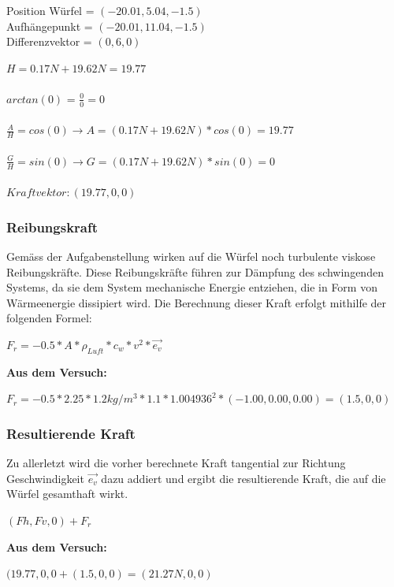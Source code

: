 \documentclass[../main.tex]{subfiles}
\begin{document}
Position Würfel = $(-20.01,5.04,-1.5)$\\
Aufhängepunkt = $(-20.01,11.04,-1.5)$\\
Differenzvektor = $(0,6,0)$\\
\begin{mdframed}
$H = 0.17N +19.62N = 19.77$\\\\
$arctan(0)$ = $\frac{0}{0} = 0$\\\\
$\frac{A}{H}= cos(0) \rightarrow A = (0.17N +19.62N) * cos(0)= 19.77$\\\\
$\frac{G}{H}= sin(0) \rightarrow G = (0.17N +19.62N) * sin(0)= 0$\\\\
$Kraftvektor: (19.77,0,0)$
\end{mdframed}
\subsubsection{Reibungskraft}
Gemäss der Aufgabenstellung wirken auf die Würfel noch turbulente viskose Reibungskräfte. Diese Reibungskräfte führen zur Dämpfung des schwingenden Systems, da sie dem System mechanische Energie entziehen, die in Form von Wärmeenergie dissipiert wird. Die Berechnung dieser Kraft erfolgt mithilfe der folgenden Formel:\begin{mdframed}
$F_r = -0.5 * A*\rho_{Luft}*c_w*v^2*\vec{e_v}$
\end{mdframed}
\textbf {Aus dem Versuch:}
\begin{mdframed}
$F_r = -0.5 * 2.25*1.2kg/m^3*1.1*1.004936^2*(-1.00, 0.00, 0.00) = (1.5,0,0)$
\end{mdframed}
\subsubsection{Resultierende Kraft}
Zu allerletzt wird die vorher berechnete Kraft tangential zur Richtung Geschwindigkeit $\vec{e_v}$ dazu addiert und ergibt die resultierende Kraft, die auf die Würfel gesamthaft wirkt.
\begin{mdframed}
$(Fh,Fv,0) + F_r$
\end{mdframed}
\textbf {Aus dem Versuch:}
\begin{mdframed}
$(19.77,0,0 + (1.5,0,0) = (21.27N,0,0)$
\end{mdframed}
\end{document}
